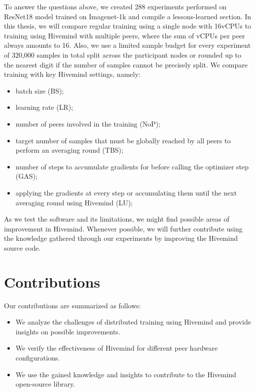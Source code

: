 To answer the questions above, we created 288 experiments performed on ResNet18 \cite{he2015deep} model trained on Imagenet-1k \cite{deng2009imagenet} and compile a lessons-learned section.
In this thesis, we will compare regular training using a single node with 16vCPUs to training using Hivemind with multiple peers, where the sum of vCPUs per peer always amounts to 16.
Also, we use a limited sample budget for every experiment of 320,000 samples in total split across the participant nodes or rounded up to the nearest digit if the number of samples cannot be precisely split.
We compare training with key Hivemind settings, namely:
\begin{itemize}
    \item batch size (BS);
    \item learning rate (LR);
    \item number of peers involved in the training (NoP);
    \item target number of samples that must be globally reached by all peers to perform an averaging round (TBS);
    \item number of steps to accumulate gradients for before calling the optimizer step (GAS);
    \item applying the gradients at every step or accumulating them until the next averaging round using Hivemind (LU);
\end{itemize}

As we test the software and its limitations, we might find possible areas of improvement in Hivemind.
Whenever possible, we will further contribute using the knowledge gathered through our experiments by improving the Hivemind \cite{hivemind} source code.

\section{Contributions}

Our contributions are summarized as follows:
\begin{itemize}
    \item We analyze the challenges of distributed training using Hivemind and provide insights on possible improvements.
    \item We verify the effectiveness of Hivemind for different peer hardware configurations.
    \item We use the gained knowledge and insights to contribute to the Hivemind open-source library.
\end{itemize}
